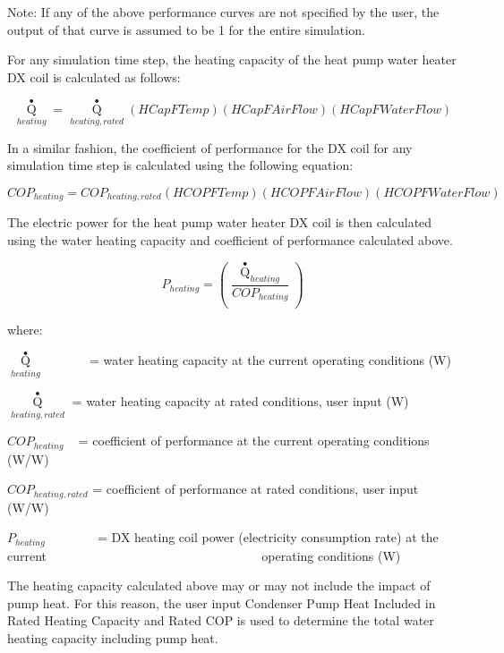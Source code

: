 Note: If any of the above performance curves are not specified by the user, the output of that curve is assumed to be 1 for the entire simulation.

For any simulation time step, the heating capacity of the heat pump water heater DX coil is calculated as follows:

\begin{equation}
{\mathop Q\limits^ \bullet_{heating}} = {\mathop Q\limits^ \bullet_{heating,rated}}\left( {HCapFTemp} \right)\left( {HCapFAirFlow} \right)\left( {HCapFWaterFlow} \right)
\end{equation}

In a similar fashion, the coefficient of performance for the DX coil for any simulation time step is calculated using the following equation:

\begin{equation}
CO{P_{heating}} = CO{P_{heating,rated}}\left( {HCOPFTemp} \right)\left( {HCOPFAirFlow} \right)\left( {HCOPFWaterFlow} \right)
\end{equation}

The electric power for the heat pump water heater DX coil is then calculated using the water heating capacity and coefficient of performance calculated above.

\begin{equation}
{P_{heating}} = \left( {\frac{{{{\mathop Q\limits^ \bullet  }_{heating}}}}{{CO{P_{heating}}}}} \right)
\end{equation}

where:

\({\mathop Q\limits^ \bullet_{heating}}\) ~~~~~~ = water heating capacity at the current operating conditions (W)

\({\mathop Q\limits^ \bullet_{heating,rated}}\) = water heating capacity at rated conditions, user input (W)

\(CO{P_{heating}}\) ~ = coefficient of performance at the current operating conditions (W/W)

\(CO{P_{heating,rated}}\) = coefficient of performance at rated conditions, user input (W/W)

\({P_{heating}}\) ~~~~~~~ = DX heating coil power (electricity consumption rate) at the current ~~~~~~~~~~~~~~~~~~~~~~~~~~~~~~ ~~~operating conditions (W)

The heating capacity calculated above may or may not include the impact of pump heat. For this reason, the user input Condenser Pump Heat Included in Rated Heating Capacity and Rated COP is used to determine the total water heating capacity including pump heat.

